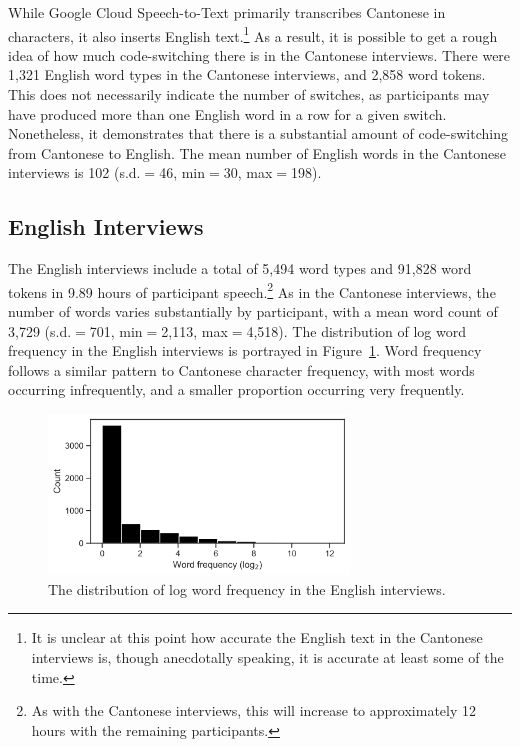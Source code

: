 While Google Cloud Speech-to-Text primarily transcribes Cantonese in characters, it also inserts English text.\footnote{It is unclear at this point how accurate the English text in the Cantonese interviews is, though anecdotally speaking, it is accurate at least some of the time.} As a result, it is possible to get a rough idea of how much code-switching there is in the Cantonese interviews. There were 1,321 English word types in the Cantonese interviews, and 2,858 word tokens. This does not necessarily indicate the number of switches, as participants may have produced more than one English word in a row for a given switch. Nonetheless, it demonstrates that there is a substantial amount of code-switching from Cantonese to English. The mean number of English words in the Cantonese interviews is 102 (s.d.$=$46, min$=$30, max$=$198). 

\subsection{English Interviews}\label{ch2:subsec:english_descriptive}
The English interviews include a total of 5,494 word types and 91,828 word tokens in 9.89 hours of participant speech.\footnote{As with the Cantonese interviews, this will increase to approximately 12 hours with the remaining participants.} As in the Cantonese interviews, the number of words varies substantially by participant, with a mean word count of 3,729 (s.d.$=$701, min$=$2,113, max$=$4,518). The distribution of log word frequency in the English interviews is portrayed in Figure~\ref{ch2:fig:ewf}. Word frequency follows a similar pattern to Cantonese character frequency, with most words occurring infrequently, and a smaller proportion occurring very frequently.

\begin{figure}[!htbp]
\begin{center}
\includegraphics[width=8cm]{figures/2-eng_word_frequency.png} 
\caption{The distribution of log word frequency in the English interviews.}
\label{ch2:fig:ewf}
\end{center}
\end{figure}

